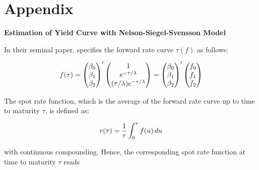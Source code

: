 \section*{Appendix}

{ \bf Estimation of Yield Curve with Nelson-Siegel-Svensson Model}

\noindent In their seminal paper, \citet{nelson1987parsimonious} specifies the forward rate curve $\tau(f)$ as follows:

\begin{equation}\notag
    f(\tau)=
    \begin{pmatrix}
    \beta_0 \\ \beta_1 \\ \beta_2    
    \end{pmatrix}'
    \begin{pmatrix}
        1 \\ e^{-\tau/\lambda} \\ (\tau / \lambda) e^{-\tau/\lambda}
    \end{pmatrix}
    =
    \begin{pmatrix}
    \beta_0 \\ \beta_1 \\ \beta_2   
    \end{pmatrix}'
    \begin{pmatrix}
    f_0 \\ f_1 \\ f_2  
    \end{pmatrix}
\end{equation}


\noindent The spot rate function, which is the average of the forward rate curve up to time to maturity $\tau$, is defined as:

\begin{equation}\notag
    r(\tau)= \frac{1}{\tau}\int_0^\tau f(u)\,du
\end{equation}

\noindent with continuous compounding. Hence, the corresponding spot rate function at time to maturity $\tau$ reads

\newpage


